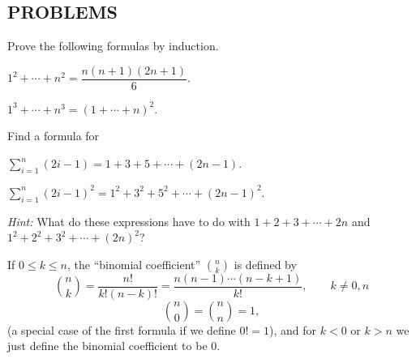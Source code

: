 \subsection*{PROBLEMS}

 Prove the following formulas by induction.
\begin{romans}
\item $1^2 + \cdots + n^2 = \dfrac{n(n+1)(2n+1)}{6}$.
\item $1^3 + \cdots + n^3 = (1 + \cdots + n)^2$.
\end{romans}

 Find a formula for
\begin{romans}
\item $\displaystyle\sum_{i=1}^{n} (2i - 1) = 1 + 3 + 5 + \cdots + (2n - 1)$.
\item $\displaystyle\sum_{i=1}^{n} (2i - 1)^2 = 1^2 + 3^2 + 5^2 + \cdots + (2n - 1)^2$.
\end{romans}
\textit{Hint:} What do these expressions have to do with
$1 + 2 + 3 + \cdots + 2n$ and $1^2 + 2^2 + 3^2 + \cdots + (2n)^2$?

 If $0 \leq k \leq n$, the ``binomial coefficient'' $\binom{n}{k}$ is
defined by
\[
\binom{n}{k} = \frac{n!}{k!(n-k)!}
= \frac{n(n-1)\cdots(n-k+1)}{k!},
\qquad k \neq 0, n
\]
\[
\binom{n}{0} = \binom{n}{n} = 1,
\]
(a special case of the first formula if we define $0! = 1$), and for $k < 0$
or $k > n$ we just define the binomial coefficient to be $0$.

